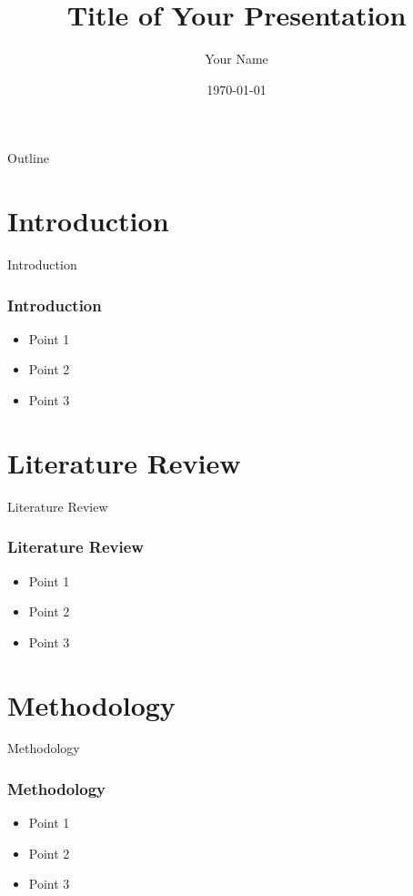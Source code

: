 \documentclass{beamer}
\title{Title of Your Presentation}
\author{Your Name}
\institute{Your Institution}
\date{\today}
\begin{document}
\begin{frame}
    \titlepage
\end{frame}

\begin{frame}{Outline}
    \tableofcontents
\end{frame}

\section{Introduction}
\begin{frame}{Introduction}
    \frametitle{Introduction}
    \begin{itemize}
        \item Point 1
        \item Point 2
        \item Point 3
    \end{itemize}
    \bigskip
    \hyperlink{literature_review}{}
\end{frame}

\section{Literature Review}
\begin{frame}[label=literature_review]{Literature Review}
    \frametitle{Literature Review}
    \begin{itemize}
        \item Point 1
        \item Point 2
        \item Point 3
    \end{itemize}
    \bigskip
    \hyperlink{introduction}{}
\end{frame}

\section{Methodology}
\begin{frame}{Methodology}
    \frametitle{Methodology}
    \begin{itemize}
        \item Point 1
        \item Point 2
        \item Point 3
    \end{itemize}
\end{frame}
\end{document}
